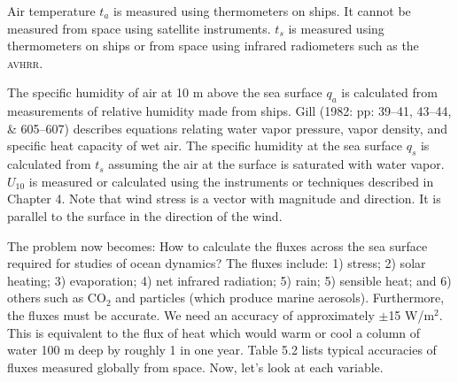 Air temperature $t_a$ is measured using thermometers on ships. It
cannot be measured from space using satellite instruments. $t_s$ is
measured using thermometers on ships or from space using infrared
radiometers such as the \textsc{avhrr}.

The specific humidity of air at 10 m above the sea surface $q_a$ is
calculated from measurements of relative humidity made from
ships. Gill (1982: pp: 39--41, 43--44, \& 605--607) describes
equations relating water vapor pressure, vapor density, and specific
heat capacity of wet air. The specific humidity at the sea surface
$q_s$ is calculated from $t_s$ assuming the air at the surface is
saturated with water vapor. $U_{10}$ is measured or calculated using
the instruments or techniques described in Chapter 4. Note that wind
stress is a vector with magnitude and
direction. It is parallel to the surface in the direction of the wind.

The problem now becomes: How to calculate the fluxes across the sea
surface required for studies of ocean dynamics? The fluxes include: 1)
stress; 2) solar heating; 3) evaporation; 4) net infrared radiation;
5) rain; 5) sensible heat; and 6) others such as CO$_2$ and particles
(which produce marine aerosols). Furthermore, the fluxes must be
accurate. We need an accuracy of
approximately $\pm$15 W/m$^2$. This is equivalent to the flux of heat
which would warm or cool a column of water 100 m deep by roughly
1 in one year. Table 5.2 lists typical accuracies of fluxes
measured globally from space. Now, let's look at each variable.


